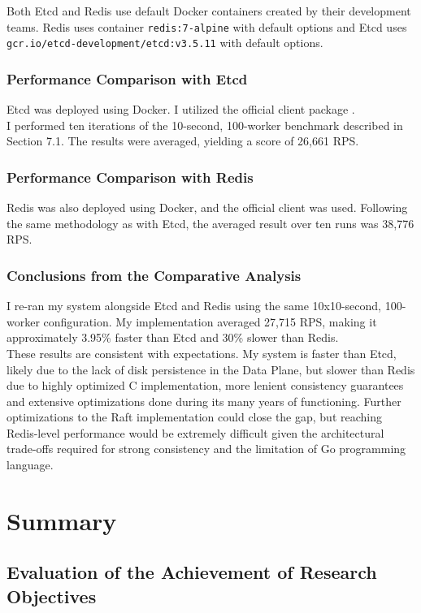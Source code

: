 \documentclass[shortabstract]{iithesis}
\begin{document}
Both Etcd and Redis use default Docker containers created by their development teams. Redis uses container \texttt{redis:7-alpine} with default options and Etcd uses \texttt{gcr.io/etcd-development/etcd:v3.5.11} with default options.

\subsection{Performance Comparison with Etcd}
Etcd was deployed using Docker. I utilized the official client package . \\
I performed ten iterations of the 10-second, 100-worker benchmark described in Section 7.1. The results were averaged, yielding a score of 26,661 RPS.

\subsection{Performance Comparison with Redis}
Redis was also deployed using Docker, and the official  client was used. 
Following the same methodology as with Etcd, the averaged result over ten runs was 38,776 RPS.

\subsection{Conclusions from the Comparative Analysis}
I re-ran my system alongside Etcd and Redis using the same 10x10-second, 100-worker configuration. My implementation averaged 27,715 RPS, making it approximately 3.95\% faster than Etcd and 30\% slower than Redis. \\
\noindent These results are consistent with expectations. My system is faster than Etcd, likely due to the lack of disk persistence in the Data Plane, but slower than Redis due to highly optimized C implementation, more lenient consistency guarantees and extensive optimizations done during its many years of functioning. Further optimizations to the Raft implementation could close the gap, but reaching Redis-level performance would be extremely difficult given the architectural trade-offs required for strong consistency and the limitation of Go programming language.

\chapter{Summary}

\section{Evaluation of the Achievement of Research Objectives}
\end{document}
